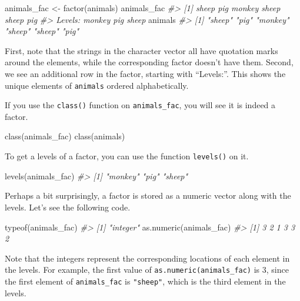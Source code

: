 \documentclass[
]{book}
\newenvironment{Shaded}{\begin{snugshade}}{\end{snugshade}}
\newcommand{\CommentTok}[1]{\textcolor[rgb]{0.56,0.35,0.01}{\textit{#1}}}
\newcommand{\FunctionTok}[1]{\textcolor[rgb]{0.00,0.00,0.00}{#1}}
\newcommand{\NormalTok}[1]{#1}
\newcommand{\OtherTok}[1]{\textcolor[rgb]{0.56,0.35,0.01}{#1}}
\begin{document}
\begin{Shaded}
\begin{Highlighting}[]
\NormalTok{animals\_fac }\OtherTok{\textless{}{-}} \FunctionTok{factor}\NormalTok{(animals)  }
\NormalTok{animals\_fac}
\CommentTok{\#\textgreater{} [1] sheep  pig    monkey sheep  sheep  pig   }
\CommentTok{\#\textgreater{} Levels: monkey pig sheep}
\NormalTok{animals}
\CommentTok{\#\textgreater{} [1] "sheep"  "pig"    "monkey" "sheep"  "sheep"  "pig"}
\end{Highlighting}
\end{Shaded}

First, note that the strings in the character vector all have quotation marks around the elements, while the corresponding factor doesn't have them. Second, we see an additional row in the factor, starting with ``Levels:''. This shows the unique elements of \texttt{animals} ordered alphabetically.

If you use the \texttt{class()} function on \texttt{animals\_fac}, you will see it is indeed a factor.

\begin{Shaded}
\begin{Highlighting}[]
\FunctionTok{class}\NormalTok{(animals\_fac)}
\FunctionTok{class}\NormalTok{(animals)}
\end{Highlighting}
\end{Shaded}

To get a levels of a factor, you can use the function \texttt{levels()} on it.

\begin{Shaded}
\begin{Highlighting}[]
\FunctionTok{levels}\NormalTok{(animals\_fac)}
\CommentTok{\#\textgreater{} [1] "monkey" "pig"    "sheep"}
\end{Highlighting}
\end{Shaded}

Perhaps a bit surprisingly, a factor is stored as a numeric vector along with the levels. Let's see the following code.

\begin{Shaded}
\begin{Highlighting}[]
\FunctionTok{typeof}\NormalTok{(animals\_fac)}
\CommentTok{\#\textgreater{} [1] "integer"}
\FunctionTok{as.numeric}\NormalTok{(animals\_fac)}
\CommentTok{\#\textgreater{} [1] 3 2 1 3 3 2}
\end{Highlighting}
\end{Shaded}

Note that the integers represent the corresponding locations of each element in the levels. For example, the first value of \texttt{as.numeric(animals\_fac)} is 3, since the first element of \texttt{animals\_fac} is \texttt{"sheep"}, which is the third element in the levels.
\end{document}
